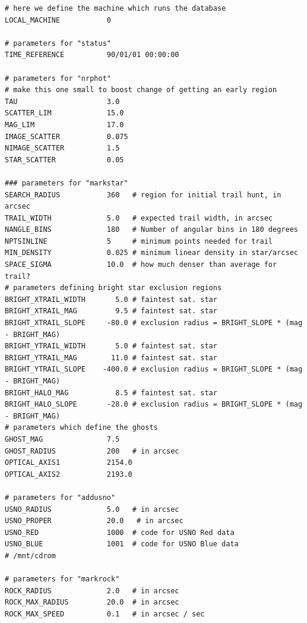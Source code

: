 \documentclass{article}
\begin{document}
\begin{verbatim}
# here we define the machine which runs the database 
LOCAL_MACHINE           0

# parameters for "status"
TIME_REFERENCE          90/01/01 00:00:00

# parameters for "nrphot"
# make this one small to boost change of getting an early region 
TAU                     3.0             
SCATTER_LIM             15.0
MAG_LIM                 17.0
IMAGE_SCATTER           0.075
NIMAGE_SCATTER          1.5
STAR_SCATTER            0.05

### parameters for "markstar"
SEARCH_RADIUS           360   # region for initial trail hunt, in arcsec 
TRAIL_WIDTH             5.0   # expected trail width, in arcsec
NANGLE_BINS             180   # Number of angular bins in 180 degrees
NPTSINLINE              5     # minimum points needed for trail
MIN_DENSITY             0.025 # minimum linear density in star/arcsec
SPACE_SIGMA             10.0  # how much denser than average for trail?
# parameters defining bright star exclusion regions
BRIGHT_XTRAIL_WIDTH       5.0 # faintest sat. star
BRIGHT_XTRAIL_MAG         9.5 # faintest sat. star
BRIGHT_XTRAIL_SLOPE     -80.0 # exclusion radius = BRIGHT_SLOPE * (mag - BRIGHT_MAG)
BRIGHT_YTRAIL_WIDTH       5.0 # faintest sat. star
BRIGHT_YTRAIL_MAG        11.0 # faintest sat. star
BRIGHT_YTRAIL_SLOPE    -400.0 # exclusion radius = BRIGHT_SLOPE * (mag - BRIGHT_MAG)
BRIGHT_HALO_MAG           8.5 # faintest sat. star
BRIGHT_HALO_SLOPE       -28.0 # exclusion radius = BRIGHT_SLOPE * (mag - BRIGHT_MAG)
# parameters which define the ghosts
GHOST_MAG               7.5
GHOST_RADIUS            200   # in arcsec
OPTICAL_AXIS1           2154.0
OPTICAL_AXIS2           2193.0

# parameters for "addusno"
USNO_RADIUS             5.0   # in arcsec
USNO_PROPER             20.0   # in arcsec
USNO_RED                1000  # code for USNO Red data
USNO_BLUE               1001  # code for USNO Blue data
# /mnt/cdrom

# parameters for "markrock"
ROCK_RADIUS             2.0   # in arcsec
ROCK_MAX_RADIUS         20.0  # in arcsec
ROCK_MAX_SPEED          0.1   # in arcsec / sec
\end{verbatim}
\end{document}
